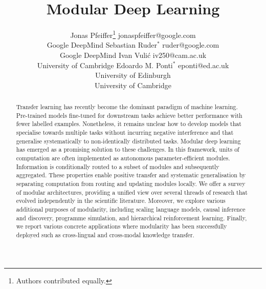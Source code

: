 \documentclass[10pt]{article} %
\title{Modular Deep Learning}
\author{\name Jonas Pfeiffer\thanks{Authors contributed equally.} \email jonaspfeiffer@google.com \\
       \addr Google DeepMind
       \AND
       \name Sebastian Ruder$^*$ \email ruder@google.com \\
       \addr Google DeepMind
       \AND
       \name Ivan Vulić \email iv250@cam.ac.uk \\
       \addr University of Cambridge
         \AND
        \name Edoardo M. Ponti$^*$ \email eponti@ed.ac.uk \\
        \addr University of Edinburgh \\
        University of Cambridge
       }
\begin{document}
\maketitle

\begin{abstract}
Transfer learning has recently become the dominant paradigm of machine learning. Pre-trained models fine-tuned for downstream tasks achieve better performance with fewer labelled examples. Nonetheless, it remains unclear how to develop models that specialise towards multiple tasks without incurring negative interference and that generalise systematically to non-identically distributed tasks. Modular deep learning has emerged as a promising solution to these challenges. In this framework, units of computation are often implemented as autonomous parameter-efficient modules. Information is conditionally routed to a subset of modules and subsequently aggregated.  These properties enable positive transfer and systematic generalisation by separating computation from routing and updating modules locally. We offer a survey of modular architectures, providing a unified view over several threads of research that evolved independently in the scientific literature. Moreover, we explore various additional purposes of modularity, including scaling language models, causal inference and discovery, programme simulation, and hierarchical reinforcement learning. Finally, we report various concrete applications where modularity has been successfully deployed such as cross-lingual and cross-modal knowledge transfer.  
\end{abstract}

% 


{\footnotesize
\tableofcontents
}

\newpage
\end{document}
